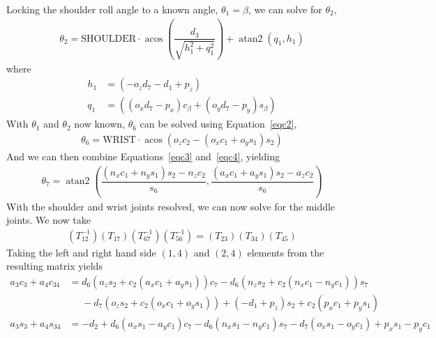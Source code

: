 \documentclass[onecolumn,10pt]{jhwhw}
\DeclareMathOperator{\atantwo}{atan2}
\DeclareMathOperator{\acos}{acos}
\begin{document}
Locking the shoulder roll angle to a known angle, $\boxed{\theta_1 = \beta}$, we can solve for $\theta_2$,
\begin{align}
\boxed{\theta_2 = \mbox{SHOULDER} \cdot \acos \left( \dfrac{d_3}{\sqrt{h_1^2 + q_1^2}} \right) + \atantwo(q_1,h_1)}
\end{align}
where
\begin{align}
h_1 &= \left(-o_{z} d_7 - d_{1} + p_{z} \right) \\
q_1 &= \left( \left( o_{x} d_7 - p_{x} \right) c_{\beta} + \left( o_{y} d_7 - p_{y} \right) s_{\beta} \right)
\end{align}
With $\theta_1$ and $\theta_2$ now known, $\theta_6$ can be solved using Equation~\ref{eqc2},
\begin{align}
\boxed{\theta_6 = \mbox{WRIST} \cdot \acos \left(o_{z} c_2 - \left( o_{x} c_1 + o_{y} s_1 \right) s_2 \right)}
\end{align}
And we can then combine Equations~\ref{eqc3} and~\ref{eqc4}, yielding
\begin{align}
\boxed{\theta_7 = \atantwo \left( \dfrac{\left(n_{x} c_1 + n_{y} s_1\right) s_2 - n_{z} c_2}{s_6},
                                  \dfrac{\left(a_{x} c_1 + a_{y} s_1\right) s_2 - a_{z} c_2}{s_6}\right)}
\end{align}
With the shoulder and wrist joints resolved, we can now solve for the middle joints. We now take
\begin{align*}
\left(T_{12}^{-1} \right) \left(T_{17}\right) \left(T_{67}^{-1}\right) \left(T_{56}^{-1}\right) = \left(T_{23}\right) \left(T_{34}\right) \left(T_{45}\right)
\end{align*}
Taking the left and right hand side $\left(1, 4\right)$ and $\left(2, 4 \right)$ elements from the resulting matrix yields
\begin{align}
a_{3} c_{3} + a_{4} c_{34} &= d_{6} \left(a_{z} s_{2} + c_{2}\left(a_{x} c_{1} + a_{y} s_{1}\right) \right) c_{7} - d_{6} \left(n_{z} s_{2} + c_{2}\left(n_{x} c_{1} - n_{y} c_{1} \right) \right) s_{7}  \nonumber \\
                           &\phantom{=} - d_{7} \left(o_{z} s_{2} + c_{2}\left(o_{x} c_{1} + o_{y} s_{1} \right) \right) + \left(- d_{1} + p_{z}\right) s_{2} + c_{2}\left(p_{x} c_{1} + p_{y} s_{1}\right) \label{mj1} \\
a_{3} s_{3} + a_{4} s_{34} &= - d_{2} + d_{6} \left(a_{x} s_{1} - a_{y} c_{1}\right) c_{7} - d_{6} \left(n_{x} s_{1} - n_{y} c_{1}\right) s_{7} - d_{7} \left(o_{x} s_{1} - o_{y} c_{1}\right) + p_{x} s_{1} - p_{y} c_{1} \label{mj2}
\end{align}
\end{document}
